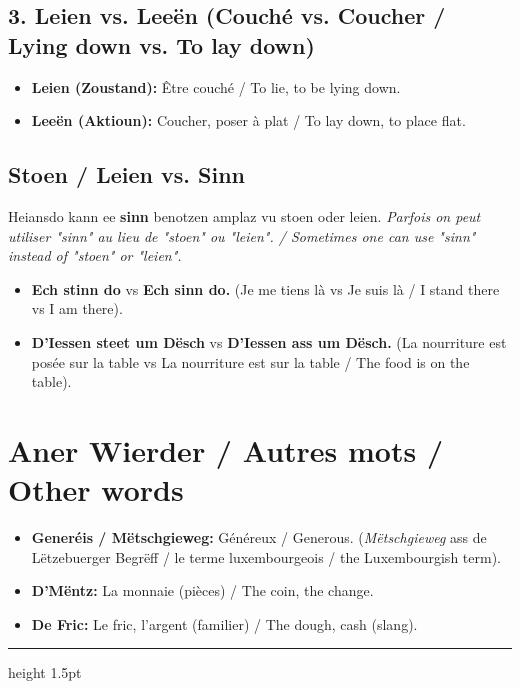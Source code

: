 \subsection*{3. Leien vs. Leeën (Couché vs. Coucher / Lying down vs. To lay down)}
\begin{itemize}
    \item \textbf{Leien (Zoustand):} Être couché / To lie, to be lying down.
    \item \textbf{Leeën (Aktioun):} Coucher, poser à plat / To lay down, to place flat.
\end{itemize}

\subsection*{Stoen / Leien vs. Sinn}
Heiansdo kann ee \textbf{sinn} benotzen amplaz vu stoen oder leien. \textit{Parfois on peut utiliser "sinn" au lieu de "stoen" ou "leien". / Sometimes one can use "sinn" instead of "stoen" or "leien".}
\begin{itemize}
    \item \textbf{Ech stinn do} vs \textbf{Ech sinn do.} (Je me tiens là vs Je suis là / I stand there vs I am there).
    \item \textbf{D'Iessen steet um Dësch} vs \textbf{D'Iessen ass um Dësch.} (La nourriture est posée sur la table vs La nourriture est sur la table / The food is on the table).
\end{itemize}

\vspace{1cm}

\section{Aner Wierder / Autres mots / Other words}

\begin{itemize}
    \item \textbf{Generéis / Mëtschgieweg:} Généreux / Generous. (\textit{Mëtschgieweg} ass de Lëtzebuerger Begrëff / le terme luxembourgeois / the Luxembourgish term).
    \item \textbf{D'Mëntz:} La monnaie (pièces) / The coin, the change.
    \item \textbf{De Fric:} Le fric, l'argent (familier) / The dough, cash (slang).
\end{itemize}

\vspace{1.5cm}
\color{geminiBlue}\hrule height 1.5pt \vspace{0.5em}\color{black}
